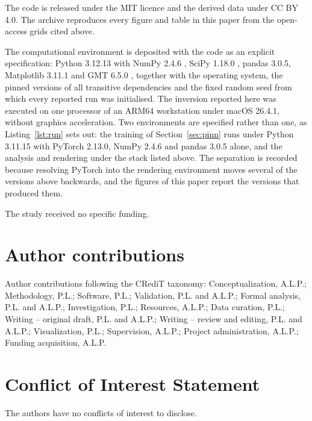 \documentclass[final]{agujournal2019}
\begin{document}
The code is released under the
MIT licence and the derived data under CC BY 4.0. The archive reproduces every
figure and table in this paper from the open-access grids cited above.

The computational environment is deposited with the code as an explicit
specification: Python 3.12.13 with NumPy 2.4.6 \cite{Harris2020}, SciPy 1.18.0
\cite{Virtanen2020}, pandas 3.0.5, Matplotlib 3.11.1 \cite{Hunter2007} and
GMT 6.5.0 \cite{Wessel2019}, together with the operating system, the
pinned versions of all transitive dependencies and the fixed random seed from
which every reported run was initialised. The inversion reported here was
executed on one processor of an ARM64 workstation under macOS 26.4.1, without
graphics acceleration. Two environments are specified rather
than one, as Listing~\ref{lst:run} sets out: the training of
Section~\ref{sec:pinn} runs under Python 3.11.15 with PyTorch 2.13.0, NumPy
2.4.6 and pandas 3.0.5 alone,
and the analysis and rendering under the stack listed above. The separation is
recorded because resolving PyTorch into the rendering environment moves several
of the versions above backwards, and the figures of this paper report the
versions that produced them.

\acknowledgments

The study received no specific funding.

\section*{Author contributions}
Author contributions following the CRediT taxonomy: Conceptualization,
A.L.P.; Methodology, P.L.; Software, P.L.; Validation, P.L. and A.L.P.; Formal
analysis, P.L. and A.L.P.; Investigation, P.L.; Resources, A.L.P.; Data
curation, P.L.; Writing -- original draft, P.L. and A.L.P.; Writing -- review
and editing, P.L. and A.L.P.; Visualization, P.L.; Supervision, A.L.P.; Project
administration, A.L.P.; Funding acquisition, A.L.P.

\section*{Conflict of Interest Statement}

The authors have no conflicts of interest to disclose.


\end{document}
